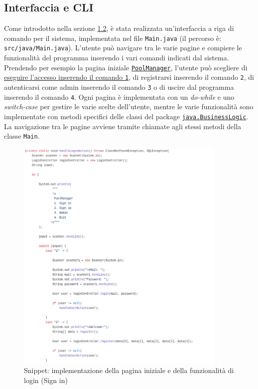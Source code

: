 \documentclass{article}
\begin{document}
{\subsection{Interfaccia e CLI}\label{subsec:interfaccia-cli}
Come introdotto nella sezione \hyperref[subsec:struttura-e-pratiche-utilizzate]{1.2}, è stata realizzata un'interfaccia a riga di comando per il sistema, implementata nel file \texttt{Main.java} (il percorso è: \texttt{src/java/Main.java}).
            L'utente può navigare tra le varie pagine e compiere le funzionalità del programma inserendo i vari comandi indicati dal sistema.
            Prendendo per esempio la pagina iniziale \hyperref[fig:navigation-diagram]{\texttt{PoolManager}}, l'utente può scegliere di \hyperref[fig:main]{eseguire l'accesso inserendo il comando \texttt{1}},
            di registrarsi inserendo il comando \texttt{2}, di autenticarsi come admin inserendo il comando \texttt{3} o di uscire dal programma inserendo il comando \texttt{4}.
            Ogni pagina è implementata con un \textit{do-while} e uno \textit{switch-case} per gestire le varie scelte dell'utente, mentre le varie funzionalità
            sono implementate con metodi specifici delle classi del package \hyperref[subsec:BusinessLogic]{\texttt{java.BusinessLogic}}.
            La navigazione tra le pagine avviene tramite chiamate agli stessi metodi della classe \texttt{Main}.
\begin{figure}[H]
                \centering
                \includegraphics[width=0.9\textwidth]{Images/Snippets/Main.png}
                \captionsetup{labelformat=empty,labelsep=none}
                \caption{Snippet: implementazione della pagina iniziale e della funzionalità di login (Sign in)}
                \label{fig:main}
            \end{figure}
\newpage
}
\end{document}
